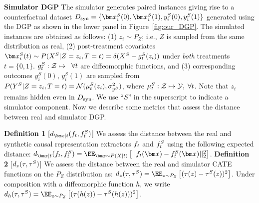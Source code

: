 \textbf{Simulator DGP} 
The simulator generates paired instances giving rise to a counterfactual dataset $\synD = \{\xb_i^S(0), \xb_i^S(1), y_i^S(0), y_i^S(1)\}$ generated using the DGP as shown in the lower panel in Figure~\ref{fig:our_DGP}. The simulated instances are obtained as follows: (1) $z_i \sim P_Z$; i.e., $Z$ is sampled from the same distribution as real, (2) post-treatment covariates $\xb_i^S(t) \sim P(X^S|Z = z_i, T = t) = \delta(X^S - \S_t(z_i))$ under \emph{both} treatments $t=\{0,1\}$. 
$g^S_t: \mathcal{Z} \mapsto \;\; \forall t$ are diffeomorphic functions, and (3) corresponding outcomes $y_i^S(0)$, $y_i^S(1)$ are sampled from $P(Y^S|Z = z_i, T = t) = \mathcal{N}(\mu^S_t(z_i), \sigma_{y^S}^2)$, where $\mu^S_t: \mathcal{Z} \mapsto \mathcal{Y},\; \forall t$. Note that $z_i$ remains hidden even in $D_{\text{syn}}$. 
We use ``$S$'' in the superscript to indicate a simulator component.  
Now we describe some metrics that assess the distance between real and simulator DGP.


\textbf{\hypertarget{def:dxt}{Definition 1}} [$d_{\xb|t}(\RInv_t,\SInv_t)$] 
We assess the distance between the real and synthetic causal representation extractors $f_t$ and $f^S_t$ using the following expected distance:
$
    d_{\xb|t}(\RInv_t,\SInv_t) = \EE_{\xb \sim P(X|t)}\left[||\RInv_t(\xb) - \SInv_t(\xb)||_{2}^{2}\right]
$.
% 
\textbf{\hypertarget{def:dz}{Definition 2}} [$d_{z}(\tau, \tau^S)$] We assess the distance between the real and simulator CATE functions on the $P_Z$ distribution as:
$
    d_{z}(\tau, \tau^S) = \EE_{z \sim P_Z}\left[(\tau(z)- \syntau(z))^2\right]
$.
% 
Under composition with a diffeomorphic function $h$, we write $d_{h}(\tau, \syntau) = \EE_{z \sim P_Z}\left[(\tau(h(z))- \syntau(h(z)))^2\right]$.


